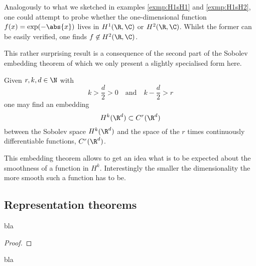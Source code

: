 \begin{rem}
	Analogously to what we sketched in examples \vref{exmp:H1sH1} and \vref{exmp:H1sH2},
	one could attempt to probe whether the one-dimensional function
	$f(x) = \exp(-\abs{x})$ lives in $H^1(\R,\C)$ or $H^2(\R,\C)$.
	Whilst the former can be easily verified,
	one finds $f \not\in H^2(\R,\C)$.
\end{rem}

This rather surprising result is a consequence of the second part of
the Sobolev embedding theorem
of which we only present a slightly specialised form here.
\begin{thm}
	Given $r, k, d \in \N$ with
	\[ k > \frac{d}{2} > 0 \quad \text{and} \quad k -\frac{d}{2} > r \]
	one may find an embedding
	\[ H^k(\R^d) \subset C^r(\R^d) \]
	between the Sobolev space $H^k(\R^d)$ and the space of the $r$ times
	continuously differentiable functions, $C^r(\R^d)$.
\end{thm}
This embedding theorem allows to get an idea what is to be expected about
the smoothness of a function in $H^k$.
Interestingly the smaller the dimensionality the more smooth such a function
has to be.

\subsection{Representation theorems}

\begin{thm}
	\label{thm:Riesz}
	bla
	\begin{proof}
	\end{proof}
\end{thm}

\begin{lem}
	\label{thm:LaxMilgram}
	bla
\end{lem}

